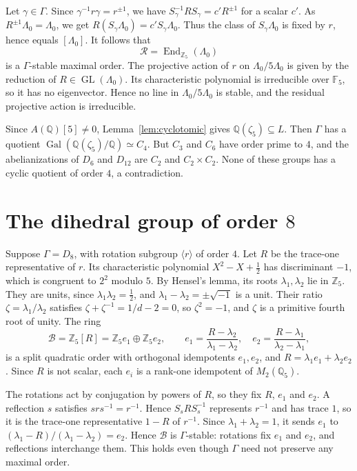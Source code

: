 \documentclass[11pt]{article}
\newcommand{\Q}{\mathbb Q}
\newcommand{\Z}{\mathbb Z}
\newcommand{\F}{\mathbb F}
\DeclareMathOperator{\End}{End}
\DeclareMathOperator{\Gal}{Gal}
\DeclareMathOperator{\GL}{GL}
\begin{document}
Let \(\gamma\in\Gamma\). Since \(\gamma^{-1}r\gamma=r^{\pm1}\), we have
\(S_\gamma^{-1}RS_\gamma=c'R^{\pm1}\) for a scalar \(c'\). As
\(R^{\pm1}\Lambda_0=\Lambda_0\), we get
\(R(S_\gamma\Lambda_0)=c'S_\gamma\Lambda_0\). Thus the class of
\(S_\gamma\Lambda_0\) is fixed by \(r\), hence equals \([\Lambda_0]\).
It follows that
\[
 \mathcal R=\End_{\Z_5}(\Lambda_0)
\]
is a \(\Gamma\)-stable maximal order. The projective action of \(r\) on
\(\Lambda_0/5\Lambda_0\) is given by the reduction of
\(R\in\GL(\Lambda_0)\). Its characteristic polynomial is irreducible
over \(\F_5\), so it has no eigenvector. Hence no line in
\(\Lambda_0/5\Lambda_0\) is stable, and the residual projective action
is irreducible.

Since \(A(\Q)[5]\neq0\), Lemma~\ref{lem:cyclotomic} gives
\(\Q(\zeta_5)\subseteq L\). Then \(\Gamma\) has a quotient
\(\Gal(\Q(\zeta_5)/\Q)\simeq C_4\). But \(C_3\) and \(C_6\) have order
prime to \(4\), and the abelianizations of \(D_6\) and \(D_{12}\) are
\(C_2\) and \(C_2\times C_2\). None of these groups has a cyclic
quotient of order \(4\), a contradiction.

\section{The dihedral group of order \(8\)}\label{sec:dihedral}

Suppose \(\Gamma=D_8\), with rotation subgroup \(\langle r\rangle\) of
order \(4\). Let \(R\) be the trace-one representative of \(r\). Its
characteristic polynomial \(X^2-X+\frac12\) has discriminant \(-1\),
which is congruent to \(2^2\) modulo \(5\). By Hensel's lemma, its
roots \(\lambda_1,\lambda_2\) lie in \(\Z_5\). They are units, since
\(\lambda_1\lambda_2=\frac12\), and \(\lambda_1-\lambda_2=\pm\sqrt{-1}\)
is a unit. Their ratio \(\zeta=\lambda_1/\lambda_2\) satisfies
\(\zeta+\zeta^{-1}=1/d-2=0\), so \(\zeta^2=-1\), and \(\zeta\) is a
primitive fourth root of unity. The ring
\[
 \mathcal B=\Z_5[R]=\Z_5e_1\oplus\Z_5e_2,\qquad
 e_1=\frac{R-\lambda_2}{\lambda_1-\lambda_2},\quad
 e_2=\frac{R-\lambda_1}{\lambda_2-\lambda_1},
\]
is a split quadratic order with orthogonal idempotents \(e_1,e_2\), and
\(R=\lambda_1e_1+\lambda_2e_2\). Since \(R\) is not scalar, each
\(e_i\) is a rank-one idempotent of \(M_2(\Q_5)\).

The rotations act by conjugation by powers of \(R\), so they fix
\(R\), \(e_1\) and \(e_2\). A reflection \(s\) satisfies
\(srs^{-1}=r^{-1}\). Hence \(S_sRS_s^{-1}\) represents \(r^{-1}\) and
has trace \(1\), so it is the trace-one representative \(1-R\) of
\(r^{-1}\). Since \(\lambda_1+\lambda_2=1\), it sends \(e_1\) to
\((\lambda_1-R)/(\lambda_1-\lambda_2)=e_2\). Hence \(\mathcal B\) is
\(\Gamma\)-stable: rotations fix \(e_1\) and \(e_2\), and reflections
interchange them. This holds even though \(\Gamma\) need not preserve
any maximal order.
\end{document}
